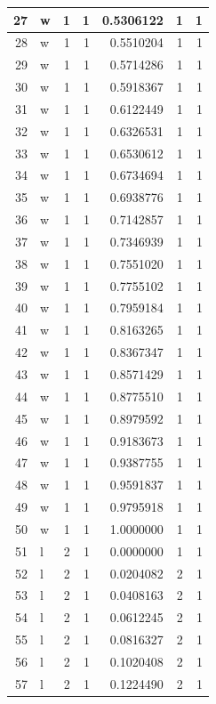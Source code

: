 \documentclass[
  letterpaper,
  DIV=11,
  numbers=noendperiod]{scrreprt}
\begin{document}
\begin{table}
\begin{tabular}[t]{r|l|r|r|r|r|r}
\hline
27 & w & 1 & 1 & 0.5306122 & 1 & 1\\
\hline
28 & w & 1 & 1 & 0.5510204 & 1 & 1\\
\hline
29 & w & 1 & 1 & 0.5714286 & 1 & 1\\
\hline
30 & w & 1 & 1 & 0.5918367 & 1 & 1\\
\hline
31 & w & 1 & 1 & 0.6122449 & 1 & 1\\
\hline
32 & w & 1 & 1 & 0.6326531 & 1 & 1\\
\hline
33 & w & 1 & 1 & 0.6530612 & 1 & 1\\
\hline
34 & w & 1 & 1 & 0.6734694 & 1 & 1\\
\hline
35 & w & 1 & 1 & 0.6938776 & 1 & 1\\
\hline
36 & w & 1 & 1 & 0.7142857 & 1 & 1\\
\hline
37 & w & 1 & 1 & 0.7346939 & 1 & 1\\
\hline
38 & w & 1 & 1 & 0.7551020 & 1 & 1\\
\hline
39 & w & 1 & 1 & 0.7755102 & 1 & 1\\
\hline
40 & w & 1 & 1 & 0.7959184 & 1 & 1\\
\hline
41 & w & 1 & 1 & 0.8163265 & 1 & 1\\
\hline
42 & w & 1 & 1 & 0.8367347 & 1 & 1\\
\hline
43 & w & 1 & 1 & 0.8571429 & 1 & 1\\
\hline
44 & w & 1 & 1 & 0.8775510 & 1 & 1\\
\hline
45 & w & 1 & 1 & 0.8979592 & 1 & 1\\
\hline
46 & w & 1 & 1 & 0.9183673 & 1 & 1\\
\hline
47 & w & 1 & 1 & 0.9387755 & 1 & 1\\
\hline
48 & w & 1 & 1 & 0.9591837 & 1 & 1\\
\hline
49 & w & 1 & 1 & 0.9795918 & 1 & 1\\
\hline
50 & w & 1 & 1 & 1.0000000 & 1 & 1\\
\hline
51 & l & 2 & 1 & 0.0000000 & 1 & 1\\
\hline
52 & l & 2 & 1 & 0.0204082 & 2 & 1\\
\hline
53 & l & 2 & 1 & 0.0408163 & 2 & 1\\
\hline
54 & l & 2 & 1 & 0.0612245 & 2 & 1\\
\hline
55 & l & 2 & 1 & 0.0816327 & 2 & 1\\
\hline
56 & l & 2 & 1 & 0.1020408 & 2 & 1\\
\hline
57 & l & 2 & 1 & 0.1224490 & 2 & 1\\

\end{tabular}
\end{table}
\end{document}
